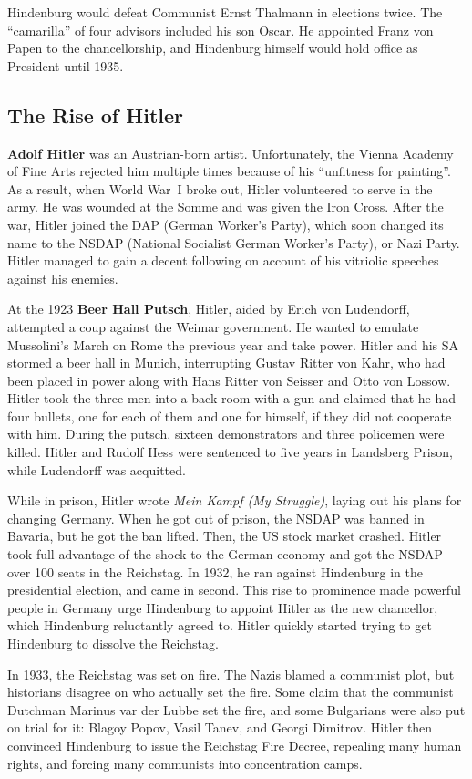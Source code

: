 Hindenburg would defeat Communist Ernst Thalmann in elections twice.
The ``camarilla'' of four advisors included his son Oscar.
He appointed Franz von Papen to the chancellorship,
and Hindenburg himself would hold office as President until 1935.

\subsection*{The Rise of Hitler}

\textbf{Adolf Hitler} was an Austrian-born artist.
Unfortunately, the Vienna Academy of Fine Arts rejected him multiple times because of his ``unfitness for painting''.
As a result, when World War~I broke out, Hitler volunteered to serve in the army.
He was wounded at the Somme and was given the Iron Cross.
After the war, Hitler joined the DAP (German Worker's Party),
which soon changed its name to the NSDAP (National Socialist German Worker's Party), or Nazi Party.
Hitler managed to gain a decent following on account of his vitriolic speeches against his enemies.

At the 1923 \textbf{Beer Hall Putsch}, Hitler, aided by Erich von Ludendorff,
attempted a coup against the Weimar government.
He wanted to emulate Mussolini's March on Rome the previous year and take power.
Hitler and his SA stormed a beer hall in Munich, interrupting Gustav Ritter von Kahr,
who had been placed in power along with Hans Ritter von Seisser and Otto von Lossow.
Hitler took the three men into a back room with a gun and claimed that he had four bullets,
one for each of them and one for himself, if they did not cooperate with him.
During the putsch, sixteen demonstrators and three policemen were killed.
Hitler and Rudolf Hess were sentenced to five years in Landsberg Prison,
while Ludendorff was acquitted.

While in prison, Hitler wrote \textit{Mein Kampf (My Struggle)}, laying out his plans for changing Germany.
When he got out of prison, the NSDAP was banned in Bavaria, but he got the ban lifted.
Then, the US stock market crashed.
Hitler took full advantage of the shock to the German economy and got the NSDAP over 100 seats in the Reichstag.
In 1932, he ran against Hindenburg in the presidential election, and came in second.
This rise to prominence made powerful people in Germany urge Hindenburg to appoint Hitler as the new chancellor,
which Hindenburg reluctantly agreed to.
Hitler quickly started trying to get Hindenburg to dissolve the Reichstag.

In 1933, the Reichstag was set on fire.
The Nazis blamed a communist plot, but historians disagree on who actually set the fire.
Some claim that the communist Dutchman Marinus var der Lubbe set the fire,
and some Bulgarians were also put on trial for it: Blagoy Popov, Vasil Tanev, and Georgi Dimitrov.
Hitler then convinced Hindenburg to issue the Reichstag Fire Decree,
repealing many human rights, and forcing many communists into concentration camps.

